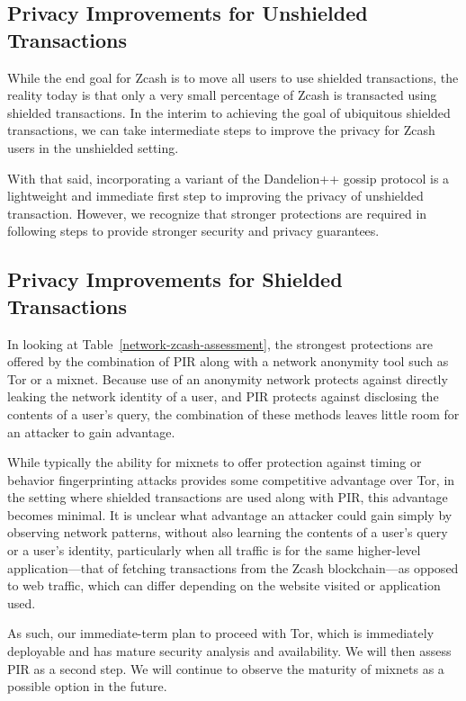 \documentclass{article}
\begin{document}
\subsection{Privacy Improvements for Unshielded Transactions}

While the end goal for Zcash is to move all users to use shielded transactions,
the reality today is that only a very small percentage of Zcash is transacted
using shielded transactions. In the interim to achieving the goal of
ubiquitous shielded transactions, we can take intermediate steps to improve
the privacy for Zcash users in the unshielded setting.

With that said, incorporating a variant of the Dandelion++ gossip protocol is a
lightweight and immediate first step to improving the privacy of unshielded
transaction. However, we recognize that stronger protections are required in
following steps to provide stronger security and privacy guarantees.

\subsection{Privacy Improvements for Shielded Transactions}

In looking at Table~\ref{network-zcash-assessment}, the strongest protections
are offered by the combination of PIR along with a network anonymity tool such
as Tor or a mixnet. Because use of an anonymity network protects against
directly leaking the network identity of a user, and PIR protects against
disclosing the contents of a user's query, the combination of these methods
leaves little room for an attacker to gain advantage.

While typically the
ability for mixnets to offer protection
against timing or behavior fingerprinting attacks provides some competitive
advantage over Tor, in the setting where shielded transactions are used along
with PIR, this advantage becomes minimal. It is unclear what advantage an
attacker could gain simply by observing network patterns, without also learning
the contents of a user's query or a user's identity, particularly when all
traffic is for the same higher-level application---that of fetching
transactions from the Zcash
blockchain---as opposed to web traffic, which can differ depending on the
website visited or application used.

As such, our immediate-term plan to proceed with Tor, which is
immediately deployable and has mature security analysis and availability. We
will then assess PIR as a second step. We will continue to observe the maturity
of mixnets as a possible option in the future.
\end{document}
